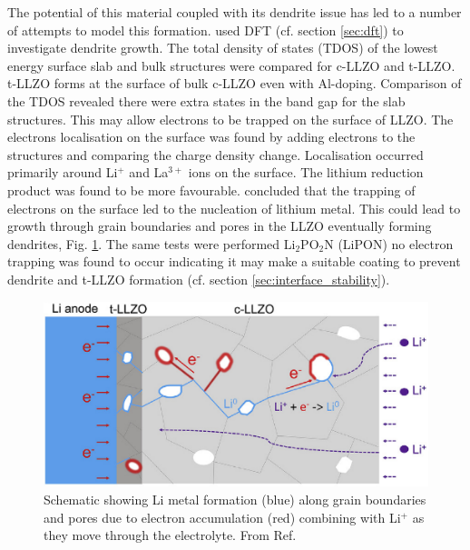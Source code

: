 \documentclass[../main.tex]{subfiles}
\begin{document}
The potential of this material coupled with its dendrite issue has led to a number of attempts to model this formation\cite{Canepa2018, Tian2018, Gao2020}. \citeauthor{Tian2018} used DFT (cf. section \ref{sec:dft}) to investigate dendrite growth. \cite{Tian2018} The total density of states (TDOS) of the lowest energy surface slab and bulk structures were compared for c-LLZO and t-LLZO. t-LLZO forms at the surface of bulk c-LLZO even with Al-doping\cite{Ma2016, Rettenwander2018}. Comparison of the TDOS revealed there were extra states in the band gap for the slab structures. This may allow electrons to be trapped on the surface of LLZO. The electrons localisation on the surface was found by adding electrons to the structures and comparing the charge density change. Localisation occurred primarily around Li$^+$ and La$^{3+}$ ions on the surface. The lithium reduction product was found to be more favourable. \citeauthor{Tian2018} concluded that the trapping of electrons on the surface led to the nucleation of lithium metal. This could lead to growth through grain boundaries and pores in the LLZO eventually forming dendrites\cite{Ren2015}, Fig. \ref{fig:tian2020}. The same tests were performed Li$_2$PO$_2$N (LiPON) no electron trapping was found to occur indicating it may make a suitable coating to prevent dendrite and t-LLZO formation (cf. section \ref{sec:interface_stability}).

\begin{figure}[H]
    \centering
    \includegraphics{figures/tian_grain_growth.png}
    \caption{Schematic showing Li metal formation (blue) along grain boundaries and pores due to electron accumulation (red) combining with Li$^+$ as they move through the electrolyte. From Ref. }
    \label{fig:tian2020}
\end{figure}
\end{document}
